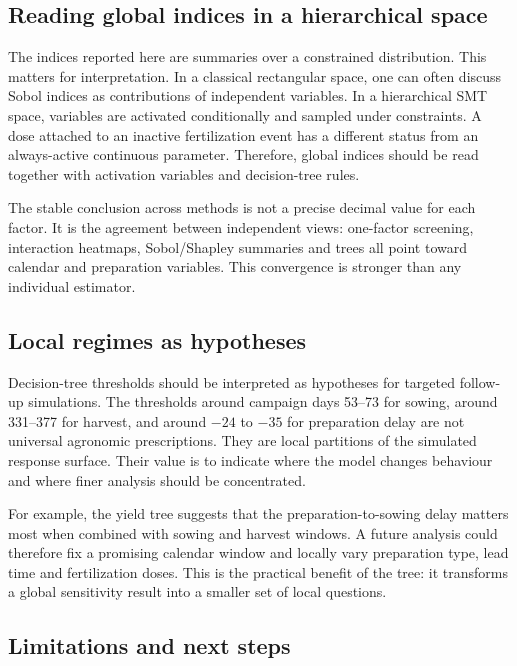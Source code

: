 \documentclass[11pt,a4paper]{article}
\begin{document}
\subsection{Reading global indices in a hierarchical space}

The indices reported here are summaries over a constrained distribution. This matters for interpretation. In a classical rectangular space, one can often discuss Sobol indices as contributions of independent variables. In a hierarchical SMT space, variables are activated conditionally and sampled under constraints. A dose attached to an inactive fertilization event has a different status from an always-active continuous parameter. Therefore, global indices should be read together with activation variables and decision-tree rules.

The stable conclusion across methods is not a precise decimal value for each factor. It is the agreement between independent views: one-factor screening, interaction heatmaps, Sobol/Shapley summaries and trees all point toward calendar and preparation variables. This convergence is stronger than any individual estimator.

\subsection{Local regimes as hypotheses}

Decision-tree thresholds should be interpreted as hypotheses for targeted follow-up simulations. The thresholds around campaign days 53--73 for sowing, around 331--377 for harvest, and around $-24$ to $-35$ for preparation delay are not universal agronomic prescriptions. They are local partitions of the simulated response surface. Their value is to indicate where the model changes behaviour and where finer analysis should be concentrated.

For example, the yield tree suggests that the preparation-to-sowing delay matters most when combined with sowing and harvest windows. A future analysis could therefore fix a promising calendar window and locally vary preparation type, lead time and fertilization doses. This is the practical benefit of the tree: it transforms a global sensitivity result into a smaller set of local questions.

\subsection{Limitations and next steps}
\end{document}
